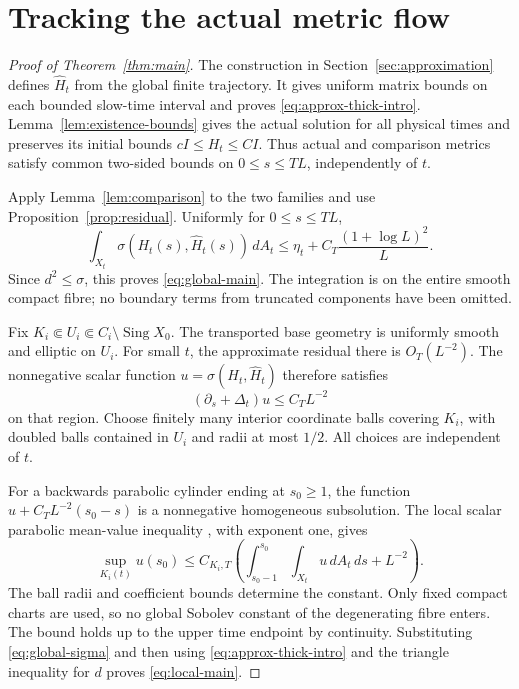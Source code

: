 \section{Tracking the actual metric flow}\label{sec:tracking}

\begin{proof}[Proof of Theorem~\ref{thm:main}]
The construction in Section~\ref{sec:approximation} defines
$\widehat H_t$ from the global finite trajectory. It gives uniform
matrix bounds on each bounded slow-time interval and proves
\eqref{eq:approx-thick-intro}.
Lemma~\ref{lem:existence-bounds} gives the actual solution for all
physical times and preserves its initial bounds $cI\le H_t\le CI$.
Thus actual and comparison metrics satisfy common two-sided bounds
on $0\le s\le TL$, independently of $t$.

Apply Lemma~\ref{lem:comparison} to the two families and use
Proposition~\ref{prop:residual}. Uniformly for $0\le s\le TL$,
\begin{equation}\label{eq:global-sigma}
 \int_{X_t}\sigma(H_t(s),\widehat H_t(s))\,dA_t
 \le\eta_t+C_T\frac{(1+\log L)^2}{L}.
\end{equation}
Since $d^2\le\sigma$, this proves \eqref{eq:global-main}. The
integration is on the entire smooth compact fibre; no boundary
terms from truncated components have been omitted.

Fix $K_i\Subset U_i\Subset C_i\setminus\operatorname{Sing}X_0$.
The transported base geometry is uniformly smooth and elliptic on
$U_i$. For small $t$, the approximate residual there is
$O_T(L^{-2})$. The nonnegative scalar function
$u=\sigma(H_t,\widehat H_t)$ therefore satisfies
\[
 (\partial_s+\Delta_t)u\le C_TL^{-2}
\]
on that region. Choose finitely many interior coordinate balls
covering $K_i$, with doubled balls contained in $U_i$ and radii
at most $1/2$. All choices are independent of $t$.

For a backwards parabolic cylinder ending at $s_0\ge1$, the
function $u+C_TL^{-2}(s_0-s)$ is a nonnegative homogeneous
subsolution. The local scalar parabolic mean-value inequality
\cite[Theorem~5.1]{saloff-coste}, with exponent one, gives
\[
 \sup_{K_i(t)}u(s_0)
 \le C_{K_i,T}\left(
       \int_{s_0-1}^{s_0}\!\int_{X_t}u\,dA_t\,ds+L^{-2}\right).
\]
The ball radii and coefficient bounds determine the constant. Only
fixed compact charts are used, so no global Sobolev constant of the
degenerating fibre enters. The bound holds up to the upper time
endpoint by continuity. Substituting \eqref{eq:global-sigma} and
then using \eqref{eq:approx-thick-intro} and the triangle inequality
for $d$ proves \eqref{eq:local-main}.
\end{proof}

